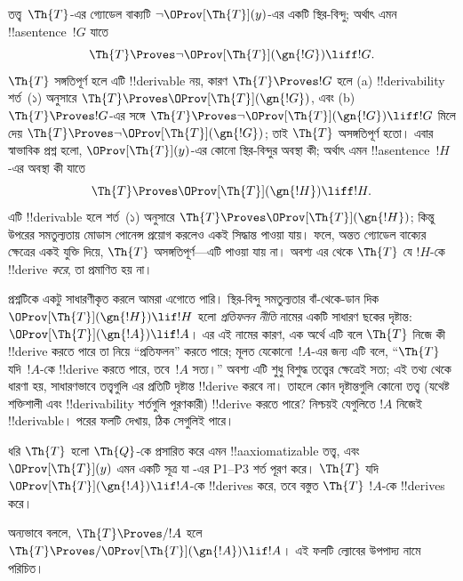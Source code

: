 \documentclass[../../../include/open-logic-section]{subfiles}
\begin{document}


তত্ত্ব~$\Th{T}$-এর গ্যোডেল বাক্যটি $\lnot
\OProv[\Th{T}](y)$-এর একটি স্থির-বিন্দু; অর্থাৎ এমন !!a{sentence}~$!G$
যাতে
\[
\Th{T} \Proves \lnot \OProv[\Th{T}](\gn{!G}) \liff !G.
\]
$\Th{T}$ সঙ্গতিপূর্ণ হলে এটি !!{derivable} নয়, কারণ $\Th{T} \Proves !G$ হলে (a)
!!{derivability} শর্ত~(১) অনুসারে $\Th{T} \Proves
\OProv[\Th{T}](\gn{!G})$, এবং (b) $\Th{T} \Proves !G$-এর সঙ্গে
$\Th{T} \Proves \lnot \OProv[\Th{T}](\gn{!G}) \liff !G$ মিলে দেয়
$\Th{T} \Proves \lnot \OProv[\Th{T}](\gn{!G})$; তাই $\Th{T}$
অসঙ্গতিপূর্ণ হতো। এবার স্বাভাবিক প্রশ্ন হলো,
$\OProv[\Th{T}](y)$-এর কোনো স্থির-বিন্দুর অবস্থা কী; অর্থাৎ এমন
!!a{sentence}~$!H$-এর অবস্থা কী যাতে
\[
\Th{T} \Proves \OProv[\Th{T}](\gn{!H}) \liff !H.
\]
এটি !!{derivable} হলে শর্ত~(১) অনুসারে $\Th{T} \Proves
\OProv[\Th{T}](\gn{!H})$; কিন্তু উপরের সমতুল্যতায় মোডাস পোনেন্স
প্রয়োগ করলেও একই সিদ্ধান্ত পাওয়া যায়। ফলে, অন্তত গ্যোডেল বাক্যের
ক্ষেত্রের একই যুক্তি দিয়ে, $\Th{T}$ অসঙ্গতিপূর্ণ—এটি পাওয়া যায় না।
অবশ্য এর থেকে $\Th{T}$ যে $!H$-কে !!{derive} \emph{করে}, তা প্রমাণিত
হয় না।

প্রশ্নটিকে একটু সাধারণীকৃত করলে আমরা এগোতে পারি। স্থির-বিন্দু সমতুল্যতার
বাঁ-থেকে-ডান দিক $\OProv[\Th{T}](\gn{!H}) \lif !H$ হলো
\emph{প্রতিফলন নীতি} নামের একটি সাধারণ ছকের দৃষ্টান্ত:
$\OProv[\Th{T}](\gn{!A}) \lif !A$। এর এই নামের কারণ, এক অর্থে এটি বলে
$\Th{T}$ নিজে কী !!{derive} করতে পারে তা নিয়ে ``প্রতিফলন'' করতে পারে;
মূলত যেকোনো~$!A$-এর জন্য এটি বলে, ``$\Th{T}$ যদি~$!A$-কে !!{derive}
করতে পারে, তবে~$!A$ সত্য।'' অবশ্য এটি শুধু বিশুদ্ধ তত্ত্বের ক্ষেত্রেই
সত্য; এই তথ্য থেকে ধারণা হয়, সাধারণভাবে তত্ত্বগুলি এর প্রতিটি দৃষ্টান্ত
!!{derive} করবে না। তাহলে কোন দৃষ্টান্তগুলি কোনো তত্ত্ব (যথেষ্ট শক্তিশালী
এবং !!{derivability} শর্তগুলি পূরণকারী) !!{derive} করতে পারে? নিশ্চয়ই
যেগুলিতে $!A$ নিজেই !!{derivable}। পরের ফলটি দেখায়, ঠিক সেগুলিই পারে।

\begin{thm}
ধরি $\Th{T}$ হলো $\Th{Q}$-কে প্রসারিত করে এমন !!a{axiomatizable} তত্ত্ব,
এবং $\OProv[\Th{T}](y)$ এমন একটি সূত্র যা
-এর P1--P3 শর্ত পূরণ করে। $\Th{T}$ যদি
$\OProv[\Th{T}](\gn{!A}) \lif !A$-কে !!{derive}s করে, তবে বস্তুত
$\Th{T}$ $!A$-কে !!{derive}s করে।
\end{thm}

অন্যভাবে বললে, $\Th{T} \Proves/ !A$ হলে $\Th{T} \Proves/
\OProv[\Th{T}](\gn{!A}) \lif !A$। এই ফলটি ল্যোবের উপপাদ্য নামে পরিচিত।
\end{document}
